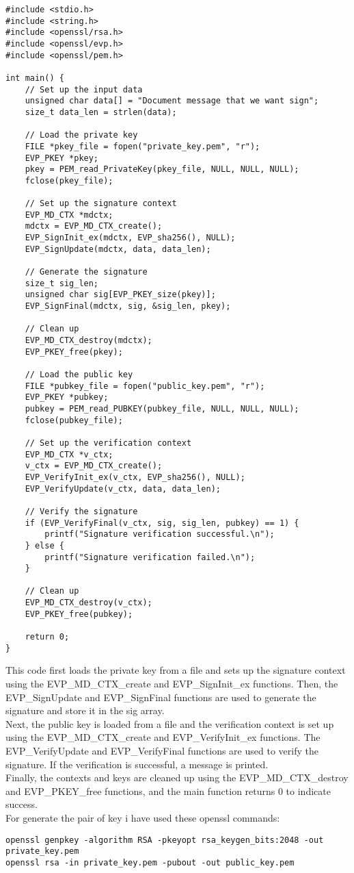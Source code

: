 \documentclass{article}
\begin{document}
\begin{lstlisting}
#include <stdio.h>
#include <string.h>
#include <openssl/rsa.h>
#include <openssl/evp.h>
#include <openssl/pem.h>

int main() {
    // Set up the input data
    unsigned char data[] = "Document message that we want sign";
    size_t data_len = strlen(data);

    // Load the private key
    FILE *pkey_file = fopen("private_key.pem", "r");
    EVP_PKEY *pkey;
    pkey = PEM_read_PrivateKey(pkey_file, NULL, NULL, NULL);
    fclose(pkey_file);

    // Set up the signature context
    EVP_MD_CTX *mdctx;
    mdctx = EVP_MD_CTX_create();
    EVP_SignInit_ex(mdctx, EVP_sha256(), NULL);
    EVP_SignUpdate(mdctx, data, data_len);

    // Generate the signature
    size_t sig_len;
    unsigned char sig[EVP_PKEY_size(pkey)];
    EVP_SignFinal(mdctx, sig, &sig_len, pkey);

    // Clean up
    EVP_MD_CTX_destroy(mdctx);
    EVP_PKEY_free(pkey);

    // Load the public key
    FILE *pubkey_file = fopen("public_key.pem", "r");
    EVP_PKEY *pubkey;
    pubkey = PEM_read_PUBKEY(pubkey_file, NULL, NULL, NULL);
    fclose(pubkey_file);

    // Set up the verification context
    EVP_MD_CTX *v_ctx;
    v_ctx = EVP_MD_CTX_create();
    EVP_VerifyInit_ex(v_ctx, EVP_sha256(), NULL);
    EVP_VerifyUpdate(v_ctx, data, data_len);

    // Verify the signature
    if (EVP_VerifyFinal(v_ctx, sig, sig_len, pubkey) == 1) {
        printf("Signature verification successful.\n");
    } else {
        printf("Signature verification failed.\n");
    }

    // Clean up
    EVP_MD_CTX_destroy(v_ctx);
    EVP_PKEY_free(pubkey);

    return 0;
}
\end{lstlisting}
This code first loads the private key from a file and sets up the signature context using the EVP\_MD\_CTX\_create and EVP\_SignInit\_ex functions. Then, the EVP\_SignUpdate and EVP\_SignFinal functions are used to generate the signature and store it in the sig array.\\
Next, the public key is loaded from a file and the verification context is set up using the EVP\_MD\_CTX\_create and EVP\_VerifyInit\_ex functions. The EVP\_VerifyUpdate and EVP\_VerifyFinal functions are used to verify the signature. If the verification is successful, a message is printed.\\
Finally, the contexts and keys are cleaned up using the EVP\_MD\_CTX\_destroy and EVP\_PKEY\_free functions, and the main function returns 0 to indicate success.\\
For generate the pair of key i have used these openssl commands:
\begin{lstlisting}
openssl genpkey -algorithm RSA -pkeyopt rsa_keygen_bits:2048 -out private_key.pem
openssl rsa -in private_key.pem -pubout -out public_key.pem
\end{lstlisting}
\end{document}
